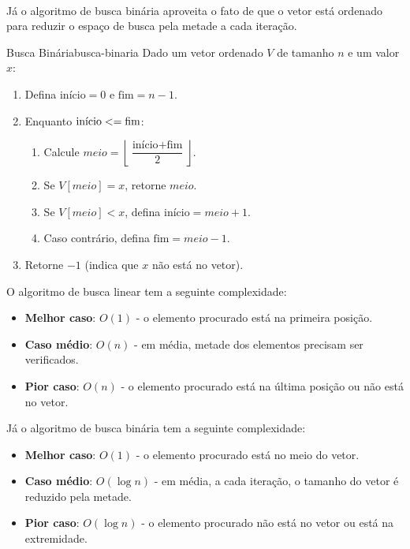 \documentclass[12pt,a4paper]{article}
\def\leq{\string<=}%
\begin{document}
\paragraph{}
Já o algoritmo de busca binária aproveita o fato de que o vetor está ordenado para reduzir o espaço de busca pela metade a cada iteração.

\begin{algobox}{Busca Binária}{busca-binaria}
    Dado um vetor ordenado \(V\) de tamanho \(n\) e um valor \(x\):
    \begin{enumerate}\setlength{\itemsep}{2pt}
        \item Defina \(\text{início} = 0\) e \(\text{fim} = n - 1\).
        \item Enquanto \(\text{início} \leq \text{fim}\):
              \begin{enumerate}\setlength{\itemsep}{2pt}
                  \item Calcule \(meio = \left\lfloor \dfrac{\text{início} + \text{fim}}{2} \right\rfloor\).
                  \item Se \(V[meio] = x\), retorne \(meio\).
                  \item Se \(V[meio] < x\), defina \(\text{início} = meio + 1\).
                  \item Caso contrário, defina \(\text{fim} = meio - 1\).
              \end{enumerate}
        \item Retorne \(-1\) (indica que \(x\) não está no vetor).
    \end{enumerate}
\end{algobox}

O algoritmo de busca linear tem a seguinte complexidade:
\begin{itemize}\setlength{\itemsep}{2pt}
    \item \textbf{Melhor caso}: \(O(1)\) - o elemento procurado está na primeira posição.
    \item \textbf{Caso médio}: \(O(n)\) - em média, metade dos elementos precisam ser verificados.
    \item \textbf{Pior caso}: \(O(n)\) - o elemento procurado está na última posição ou não está no vetor.
\end{itemize}

Já o algoritmo de busca binária tem a seguinte complexidade:
\begin{itemize}\setlength{\itemsep}{2pt}
    \item \textbf{Melhor caso}: \(O(1)\) - o elemento procurado está no meio do vetor.
    \item \textbf{Caso médio}: \(O(\log n)\) - em média, a cada iteração, o tamanho do vetor é reduzido pela metade.
    \item \textbf{Pior caso}: \(O(\log n)\) - o elemento procurado não está no vetor ou está na extremidade.
\end{itemize}
\end{document}
